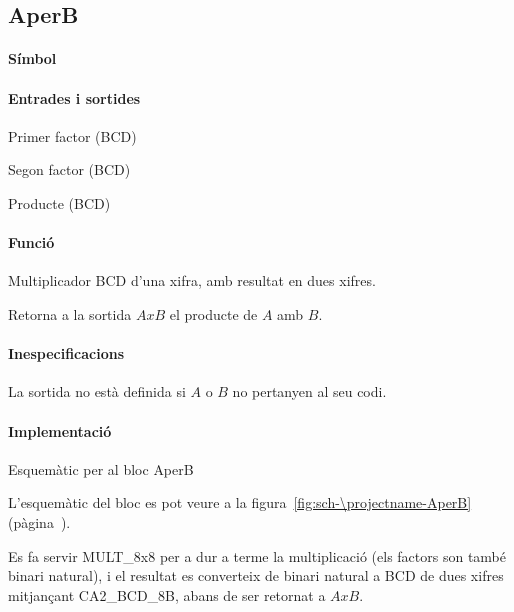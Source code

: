 \subsection{\label{sub:\projectname-AperB} \textsf{AperB}}

\paragraph{Símbol}

\begin{center}  \end{center}

\paragraph{Entrades i sortides}

\begin{where}
\item[\nodenamerange{A}{3}{0}] Primer factor (BCD)
\item[\nodenamerange{B}{3}{0}] Segon factor (BCD)
\item[\nodenamerange{AxB}{7}{0}] Producte (BCD)
\end{where}

\paragraph{Funció}

Multiplicador BCD d'una xifra, amb resultat en dues xifres.

Retorna a la sortida $AxB$ el producte de $A$ amb $B$.

\paragraph{Inespecificacions}


La sortida no està definida si $A$ o $B$ no pertanyen al seu codi.


\paragraph{Implementació}


\begin{contendfig}
  \begin{center}
  \end{center}
  \caption{\label{fig:sch-\projectname-AperB} Esquemàtic per al bloc \textsf{AperB}}
\end{contendfig}

L'esquemàtic del bloc es pot veure a la figura~\ref{fig:sch-\projectname-AperB} (pàgina~\pageref{fig:sch-\projectname-AperB}).

Es fa servir \textsf{MULT\_8x8} per a dur a terme la multiplicació
(els factors son també binari natural), i el resultat es converteix
de binari natural a BCD de dues xifres mitjançant \textsf{CA2\_BCD\_8B},
abans de ser retornat a $AxB$.

\vspace{1cm}
